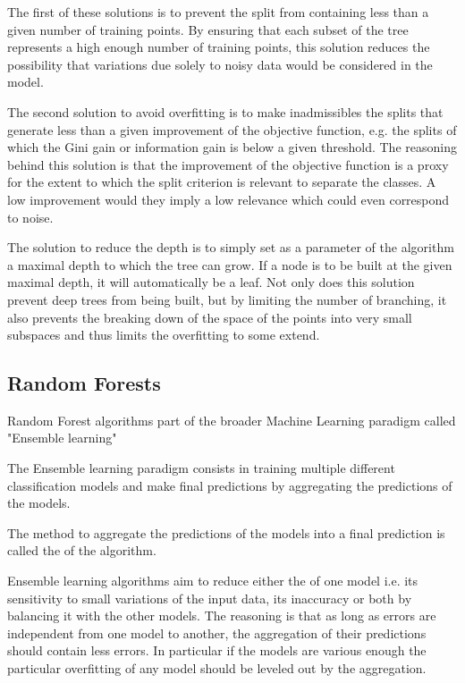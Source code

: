 The first of these solutions is to prevent the split from containing less than a given number of training points. By ensuring that each subset of the tree represents a high enough number of training points, this solution reduces the possibility that variations due solely to noisy data would be considered in the model.

The second solution to avoid overfitting is to make inadmissibles the splits that generate less than a given improvement of the objective function, e.g. the splits of which the Gini gain or information gain is below a given threshold. The reasoning behind this solution is that the improvement of the objective function is a proxy for the extent to which the split criterion is relevant to separate the classes. A low improvement would they imply a low relevance which could even correspond to noise.

The solution to reduce the depth is to simply set as a parameter of the algorithm a maximal depth to which the tree can grow. If a node is to be built at the given maximal depth, it will automatically be a leaf. Not only does this solution prevent deep trees from being built, but by limiting the number of branching, it also prevents the breaking down of the space of the points into very small subspaces and thus limits the overfitting to some extend.

\subsection{Random Forests}
Random Forest algorithms part of the broader Machine Learning paradigm called "Ensemble learning"
\begin{definition}
The Ensemble learning paradigm consists in training multiple different classification models and make final predictions by aggregating the predictions of the models.
\end{definition}

The method to aggregate the predictions of the models into a final prediction is called the  of the algorithm.

Ensemble learning algorithms aim to reduce either the  of one model i.e. its sensitivity to small variations of the input data, its inaccuracy or both by balancing it with the other models. The reasoning is that as long as errors are independent from one model to another, the aggregation of their predictions should contain less errors. In particular if the models are various enough the particular overfitting of any model should be leveled out by the aggregation.

